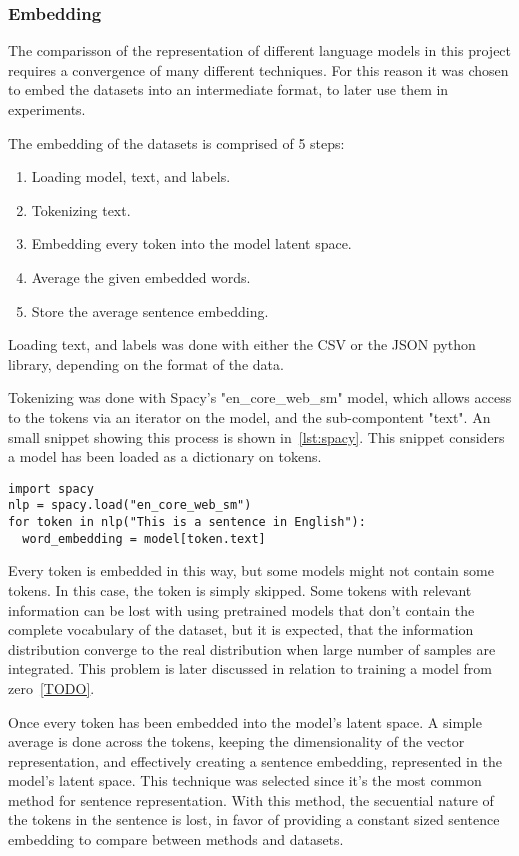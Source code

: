 \subsubsection{Embedding}\label{subs:Embedding}
The comparisson of the representation of different language models in this project requires a convergence of many different techniques. For this reason it was chosen to embed the datasets into an intermediate format, to later use them in experiments.

The embedding of the datasets is comprised of 5 steps:

\begin{enumerate}
  \item Loading model, text, and labels.
  \item Tokenizing text.
  \item Embedding every token into the model latent space.
  \item Average the given embedded words.
  \item Store the average sentence embedding.
\end{enumerate}

Loading text, and labels was done with either the CSV\cite{TODO} or the JSON\cite{TODO} python library, depending on the format of the data.

Tokenizing was done with Spacy's "en_core_web_sm" model, which allows access to the tokens via an iterator on the model, and the sub-compontent "text". An small snippet showing this process is shown in~\ref{lst:spacy}. This snippet considers a model has been loaded as a dictionary on tokens.

\begin{lstlisting}[caption={Tokenizing with Spacy},label=lst:spacy,frame=single]
import spacy
nlp = spacy.load("en_core_web_sm")
for token in nlp("This is a sentence in English"):
  word_embedding = model[token.text]
\end{lstlisting}

Every token is embedded in this way, but some models might not contain some tokens. In this case, the token is simply skipped. Some tokens with relevant information can be lost with using pretrained models that don't contain the complete vocabulary of the dataset, but it is expected, that the information distribution converge to the real distribution when large number of samples are integrated. This problem is later discussed in relation to training a model from zero~\ref{TODO}.

Once every token has been embedded into the model's latent space. A simple average is done across the tokens, keeping the dimensionality of the vector representation, and effectively creating a sentence embedding, represented in the model's latent space. This technique was selected since it's the most common \cite{TODO} method for sentence representation. With this method, the secuential nature of the tokens in the sentence is lost, in favor of providing a constant sized sentence embedding to compare between methods and datasets.

